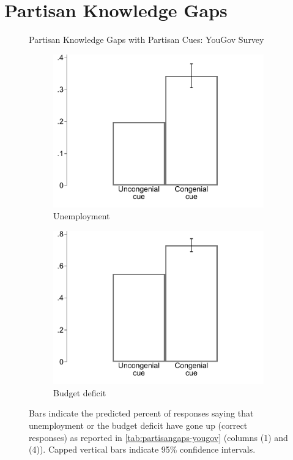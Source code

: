 \documentclass[12pt, letterpaper]{article}
\begin{document}
\section*{Partisan Knowledge Gaps}
\begin{figure}[ht]
	\caption{Partisan Knowledge Gaps with Partisan Cues: YouGov Survey}	
	\centering
	\begin{subfigure}{.495\textwidth}\centering
		\includegraphics[width=\textwidth]{../figs/yougov-unemp-congenialcue.pdf}
		\caption{Unemployment}
	\end{subfigure}
	\hfil
	\begin{subfigure}{.495\textwidth}\centering
		\includegraphics[width=\textwidth]{../figs/yougov-deficit-congenialcue.pdf}
		\caption{Budget deficit}
	\end{subfigure}	
	\caption*{\footnotesize Bars indicate the predicted percent of responses saying that unemployment or the budget deficit have gone up (correct responses) as reported in \cref{tab:partisangaps-yougov} (columns (1) and (4)).  
	Capped vertical bars indicate 95\% confidence intervals.
	}
	\label{fig:yougov-reg}
\end{figure}
\end{document}
